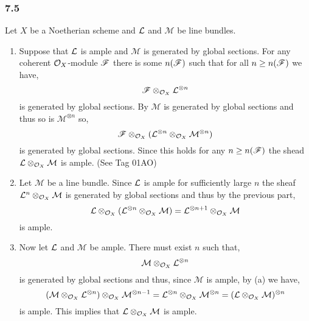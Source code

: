 \documentclass[12pt]{article}
\begin{document}
\subsubsection{7.5}

\newcommand{\M}{\mathcal{M}}

Let $X$ be a Noetherian scheme and $\mathcal{L}$ and $\M$ be line bundles.

\begin{enumerate}
\item Suppose that $\mathcal{L}$ is ample and $\M$ is generated by global sections. For any coherent $\mathcal{O}_{X}$-module $\mathscr{F}$ there is some $n(\mathscr{F})$ such that for all $n \ge n(\mathscr{F})$ we have,
\[ \mathscr{F} \otimes_{\mathcal{O}_{X}} \mathcal{L}^{\otimes n} \]
is generated by global sections. By $\M$ is generated by global sections and thus so is $\M^{\otimes n}$ so,
\[  \F \otimes_{\struct{X}} (\L^{\otimes n} \otimes_{\struct{X}} \M^{\otimes n}) \]
is generated by global sections. Since this holds for any $n \ge n(\mathscr{F})$ the shead $\L \otimes_{\struct{X}} \M$ is ample. (See Tag 01AO)

\item Let $\M$ be a line bundle. Since $\mathcal{L}$ is ample for sufficiently large $n$ the sheaf $\L^n \otimes_{\struct{X}} \M$ is generated by global sections and thus by the previous part,
\[ \L \otimes_{\struct{X}} (\L^{\otimes n} \otimes_{\struct{X}} \M) = \L^{\otimes n+1} \otimes_{\struct{X}} \M \]
is ample.
\item Now let $\mathcal{L}$ and $\M$ be ample. There must exist $n$ such that,
\[ \M \otimes_{\struct{X}} \L^{\otimes n} \]
is generated by global sections and thus, since $\M$ is ample, by (a) we have,
\[ (\M \otimes_{\struct{X}} \L^{\otimes n}) \otimes_{\struct{X}} \M^{\otimes n - 1} =  \L^{\otimes n} \otimes_{\struct{X}} \M^{\otimes n} = (\L \otimes_{\struct{X}} \M)^{\otimes n} \]
is ample. This implies that $\L \otimes_{\struct{X}} \M$ is ample. 



\end{enumerate}
\end{document}
